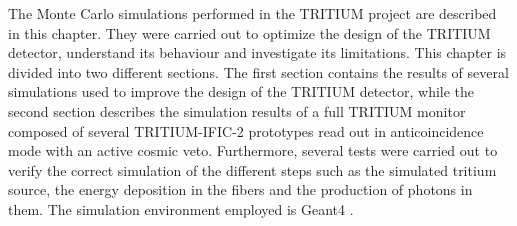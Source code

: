 The Monte Carlo simulations performed in the TRITIUM project are described in this chapter. They were carried out to optimize the design of the TRITIUM detector, understand its behaviour and investigate its limitations. This chapter is divided into two different sections. The first section contains the results of several simulations used to improve the design of the TRITIUM detector, while the second section describes the simulation results of a full TRITIUM monitor composed of several TRITIUM-IFIC-2 prototypes read out in anticoincidence mode with an active cosmic veto. Furthermore, several tests were carried out to verify the correct simulation of the different steps such as the simulated tritium source, the energy deposition in the fibers and the production of photons in them. The simulation environment employed is Geant4 \cite{Geant4WebPage, Geant4P}.